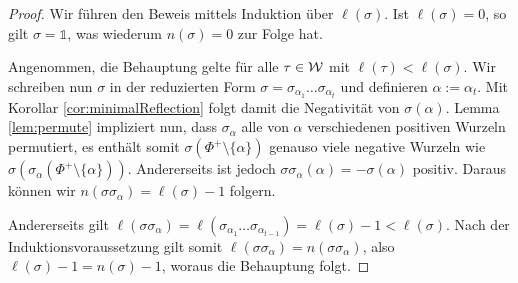 \begin{proof}
  Wir führen den Beweis mittels Induktion über $\ell(\sigma)$.
  Ist $\ell(\sigma)=0$, so gilt $\sigma = \mathds{1}$, was wiederum $n(\sigma)=0$ zur Folge hat.

  Angenommen, die Behauptung gelte für alle $\tau \in \mathcal{W}$ mit $\ell(\tau) < \ell(\sigma)$.
  Wir schreiben nun $\sigma$ in der reduzierten Form $\sigma = \sigma_{\alpha_1} \dots \sigma_{\alpha_t}$ und definieren $\alpha := \alpha_t$.
  Mit Korollar \ref{cor:minimalReflection} folgt damit die Negativität von $\sigma(\alpha)$.
  Lemma \ref{lem:permute} impliziert nun, dass $\sigma_\alpha$ alle von $\alpha$ verschiedenen positiven Wurzeln permutiert, es enthält somit $\sigma(\Phi^+ \setminus \{\alpha\})$ genauso viele negative Wurzeln wie $\sigma(\sigma_\alpha(\Phi^+ \setminus \{\alpha\}))$.
  Andererseits ist jedoch $\sigma \sigma_\alpha (\alpha) = -\sigma(\alpha)$ positiv.
  Daraus können wir $n(\sigma\sigma_\alpha) = \ell(\sigma) - 1$ folgern.
  
  Andererseits gilt $\ell(\sigma\sigma_\alpha) = \ell(\sigma_{\alpha_1} \dots \sigma_{\alpha_{t -1}}) = \ell(\sigma) - 1 < \ell(\sigma)$.
  Nach der Induktionsvoraussetzung gilt somit $\ell(\sigma\sigma_\alpha) = n(\sigma\sigma_\alpha)$, also $\ell(\sigma) - 1 = n(\sigma) - 1$, woraus die Behauptung folgt.
\end{proof}


